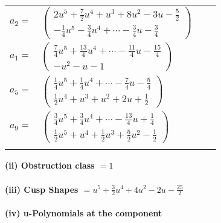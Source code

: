 \documentclass[1p]{elsarticle_modified}
\theoremstyle{definition}
\begin{document}
\begin{tabular}{m{7pt} m{180pt} m{7pt} m{180pt} }
\flushright $a_{2}=$&$\begin{pmatrix}2 u^5+\frac{7}{2} u^4+u^3+8 u^2-3 u-\frac{5}{2}\\-\frac{1}{4} u^5-\frac{3}{4} u^4+\cdots-\frac{3}{4} u-\frac{3}{4}\end{pmatrix}$ \\
\flushright $a_{1}=$&$\begin{pmatrix}\frac{7}{4} u^5+\frac{13}{4} u^4+\cdots-\frac{11}{4} u-\frac{15}{4}\\- u^2- u-1\end{pmatrix}$ \\
\flushright $a_{5}=$&$\begin{pmatrix}\frac{1}{4} u^5+\frac{1}{4} u^4+\cdots-\frac{7}{4} u-\frac{5}{4}\\\frac{1}{2} u^4+u^3+u^2+2 u+\frac{1}{2}\end{pmatrix}$ \\
\flushright $a_{9}=$&$\begin{pmatrix}\frac{3}{4} u^5+\frac{3}{4} u^4+\cdots-\frac{13}{4} u+\frac{1}{4}\\\frac{1}{2} u^5+u^4+\frac{1}{2} u^3+\frac{5}{2} u^2-\frac{1}{2}\end{pmatrix}$\\&\end{tabular}
\flushleft \textbf{(ii) Obstruction class $= 1$}\\~\\
\flushleft \textbf{(iii) Cusp Shapes $= u^5+\frac{3}{2} u^4+4 u^2-2 u-\frac{25}{2}$}\\~\\
\newpage\renewcommand{\arraystretch}{1}
\flushleft \textbf{(iv) u-Polynomials at the component}\newline \\
\end{document}
